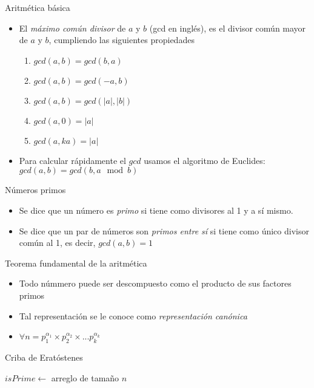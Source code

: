 \documentclass[]{beamer}
\begin{document}
\begin{frame}{Aritm\'etica b\'asica}
  \begin{itemize}
    \item El \textit{m\'aximo com\'un divisor} de $a$ y $b$ (gcd en ingl\'es), es el divisor com\'un mayor de $a$ y $b$, cumpliendo las siguientes propiedades
      \pause
      \begin{enumerate}
        \item $gcd(a,b) = gcd(b,a)$
          \pause
        \item $gcd(a,b) = gcd(-a,b)$
          \pause
        \item $gcd(a,b) = gcd(|a|, |b|)$
          \pause
        \item $gcd(a, 0) = |a|$
          \pause
        \item $gcd(a, ka) = |a|$
      \end{enumerate}
      \pause
    \item Para calcular r\'apidamente el $gcd$ usamos el algoritmo de Euclides: $gcd(a,b) = gcd(b, a \mod b)$
  \end{itemize}
\end{frame}

\begin{frame}{N\'umeros primos}
  \begin{itemize}
    \item Se dice que un n\'umero es \textit{primo} si tiene como divisores al 1 y a s\'i mismo.
      \pause
    \item Se dice que un par de n\'umeros son \textit{primos entre s\'i} si tiene como \'unico divisor com\'un al 1, es decir, $gcd(a,b) = 1$
  \end{itemize}
\end{frame}

\begin{frame}{Teorema fundamental de la aritm\'etica}
  \begin{itemize}
    \item Todo n\'ummero puede ser descompuesto como el producto de sus factores primos
      \pause
    \item Tal representaci\'on se le conoce como \textit{representaci\'on can\'onica}
      \pause
    \item $\forall n = p_1^{\alpha_1} \times p_2^{\alpha_2} \times ... p_k^{\alpha_k}$
  \end{itemize}
\end{frame}

\begin{frame}{Criba de Erat\'ostenes}
  \begin{algorithm}[H]
    \SetAlgoLined
    $isPrime \leftarrow$ arreglo de tama\~no $n$\;
  \end{algorithm}
\end{frame}
\end{document}
